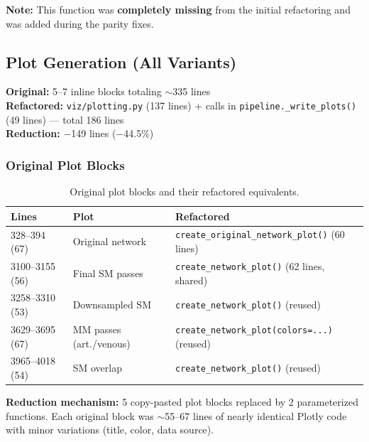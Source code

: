 \documentclass[11pt,letterpaper]{article}
\newcommand{\code}[1]{\texttt{#1}}
\begin{document}
\textbf{Note:} This function was \textbf{completely missing} from the initial refactoring and was added during the parity fixes.

\subsection{Plot Generation (All Variants)}

\textbf{Original:} 5--7 inline blocks totaling $\sim$335 lines\\
\textbf{Refactored:} \code{viz/plotting.py} (137 lines) + calls in \code{pipeline.\_write\_plots()} (49 lines) --- total 186 lines\\
\textbf{Reduction:} $-$149 lines ($-$44.5\%)

\subsubsection{Original Plot Blocks}

\begin{table}[h]
\centering
\small
\begin{tabularx}{\textwidth}{l l X}
\toprule
\textbf{Lines} & \textbf{Plot} & \textbf{Refactored} \\
\midrule
328--394 (67)    & Original network          & \code{create\_original\_network\_plot()} (60 lines) \\
3100--3155 (56)  & Final SM passes           & \code{create\_network\_plot()} (62 lines, shared) \\
3258--3310 (53)  & Downsampled SM            & \code{create\_network\_plot()} (reused) \\
3629--3695 (67)  & MM passes (art./venous)   & \code{create\_network\_plot(colors=...)} (reused) \\
3965--4018 (54)  & SM overlap                & \code{create\_network\_plot()} (reused) \\
\bottomrule
\end{tabularx}
\caption{Original plot blocks and their refactored equivalents.}
\end{table}

\textbf{Reduction mechanism:} 5 copy-pasted plot blocks replaced by 2 parameterized functions. Each original block was $\sim$55--67 lines of nearly identical Plotly code with minor variations (title, color, data source).
\end{document}
